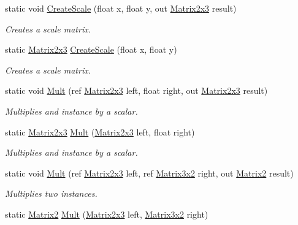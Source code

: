 \begin{DoxyCompactItemize}
static void \hyperlink{struct_open_t_k_1_1_matrix2x3_abb2ee33a0a18d2d964c34eb5fd054241}{Create\-Scale} (float x, float y, out \hyperlink{struct_open_t_k_1_1_matrix2x3}{Matrix2x3} result)
\begin{DoxyCompactList}\small\item\em Creates a scale matrix. \end{DoxyCompactList}\item 
static \hyperlink{struct_open_t_k_1_1_matrix2x3}{Matrix2x3} \hyperlink{struct_open_t_k_1_1_matrix2x3_a416d80c0f8913fcceee5325e212fc0ef}{Create\-Scale} (float x, float y)
\begin{DoxyCompactList}\small\item\em Creates a scale matrix. \end{DoxyCompactList}\item 
static void \hyperlink{struct_open_t_k_1_1_matrix2x3_a9a43a0d43f51fd03794a0c9840fc9bfc}{Mult} (ref \hyperlink{struct_open_t_k_1_1_matrix2x3}{Matrix2x3} left, float right, out \hyperlink{struct_open_t_k_1_1_matrix2x3}{Matrix2x3} result)
\begin{DoxyCompactList}\small\item\em Multiplies and instance by a scalar. \end{DoxyCompactList}\item 
static \hyperlink{struct_open_t_k_1_1_matrix2x3}{Matrix2x3} \hyperlink{struct_open_t_k_1_1_matrix2x3_a26a62b12487b1c8db5b95b20d2a7187c}{Mult} (\hyperlink{struct_open_t_k_1_1_matrix2x3}{Matrix2x3} left, float right)
\begin{DoxyCompactList}\small\item\em Multiplies and instance by a scalar. \end{DoxyCompactList}\item 
static void \hyperlink{struct_open_t_k_1_1_matrix2x3_af0d2635057dc9d403a24ff0215d24ddb}{Mult} (ref \hyperlink{struct_open_t_k_1_1_matrix2x3}{Matrix2x3} left, ref \hyperlink{struct_open_t_k_1_1_matrix3x2}{Matrix3x2} right, out \hyperlink{struct_open_t_k_1_1_matrix2}{Matrix2} result)
\begin{DoxyCompactList}\small\item\em Multiplies two instances. \end{DoxyCompactList}\item 
static \hyperlink{struct_open_t_k_1_1_matrix2}{Matrix2} \hyperlink{struct_open_t_k_1_1_matrix2x3_a8bbff32e48735fe0294526c5d2e32870}{Mult} (\hyperlink{struct_open_t_k_1_1_matrix2x3}{Matrix2x3} left, \hyperlink{struct_open_t_k_1_1_matrix3x2}{Matrix3x2} right)

\end{DoxyCompactItemize}
